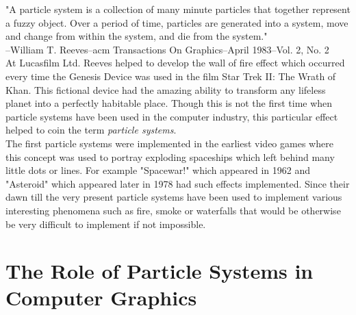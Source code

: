 "A particle system is a collection of many minute particles that together represent a fuzzy object. Over a period of time, particles are generated into a system, move and change from within the system, and die from the system."\\

--William T. Reeves--acm Transactions On Graphics--April 1983--Vol. 2, No. 2\\

At Lucasfilm Ltd. Reeves helped to develop the wall of fire effect which occurred every time the Genesis Device was used in the film Star Trek II: The Wrath of Khan. This fictional device had the amazing ability to transform any lifeless planet into a perfectly habitable place. Though this is not the first time when particle systems have been used in the computer industry, this particular effect helped to coin the term \textit{particle systems}.\\ 

The first particle systems were implemented in the earliest video games where this concept was used to portray exploding spaceships which left behind many little dots or lines. For example "Spacewar!" which appeared in 1962 and "Asteroid" which appeared later in 1978 had such effects implemented. Since their dawn till the very present particle systems have been used to implement various interesting phenomena such as fire, smoke or waterfalls that would be otherwise be very difficult to implement if not impossible.

\section{The Role of Particle Systems in Computer Graphics}